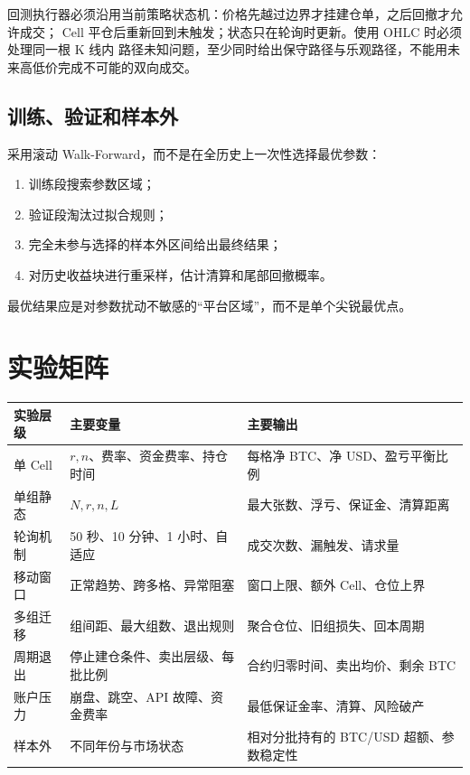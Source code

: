 \documentclass[11pt,a4paper,fontset=none]{ctexart}
\begin{document}
回测执行器必须沿用当前策略状态机：价格先越过边界才挂建仓单，之后回撤才允许成交；
Cell 平仓后重新回到未触发；状态只在轮询时更新。使用 OHLC 时必须处理同一根 K 线内
路径未知问题，至少同时给出保守路径与乐观路径，不能用未来高低价完成不可能的双向成交。

\subsection{训练、验证和样本外}

采用滚动 Walk-Forward，而不是在全历史上一次性选择最优参数：

\begin{enumerate}
  \item 训练段搜索参数区域；
  \item 验证段淘汰过拟合规则；
  \item 完全未参与选择的样本外区间给出最终结果；
  \item 对历史收益块进行重采样，估计清算和尾部回撤概率。
\end{enumerate}

最优结果应是对参数扰动不敏感的“平台区域”，而不是单个尖锐最优点。

\section{实验矩阵}

\begin{longtable}{p{3.2cm}p{5.2cm}p{5.4cm}}
  \toprule
  实验层级 & 主要变量 & 主要输出 \\
  \midrule
  \endhead
  单 Cell & $r,n$、费率、资金费率、持仓时间 & 每格净 BTC、净 USD、盈亏平衡比例 \\
  单组静态 & $N,r,n,L$ & 最大张数、浮亏、保证金、清算距离 \\
  轮询机制 & 50 秒、10 分钟、1 小时、自适应 & 成交次数、漏触发、请求量 \\
  移动窗口 & 正常趋势、跨多格、异常阻塞 & 窗口上限、额外 Cell、仓位上界 \\
  多组迁移 & 组间距、最大组数、退出规则 & 聚合仓位、旧组损失、回本周期 \\
  周期退出 & 停止建仓条件、卖出层级、每批比例 & 合约归零时间、卖出均价、剩余 BTC \\
  账户压力 & 崩盘、跳空、API 故障、资金费率 & 最低保证金率、清算、风险破产 \\
  样本外 & 不同年份与市场状态 & 相对分批持有的 BTC/USD 超额、参数稳定性 \\
  \bottomrule
\end{longtable}
\end{document}

